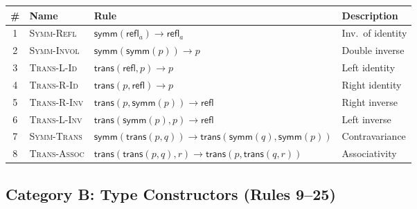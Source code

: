 \documentclass[manuscript]{BSLstyle}
\newcommand{\refl}{\mathsf{refl}}
\newcommand{\symm}{\mathsf{symm}}
\newcommand{\trans}{\mathsf{trans}}
\begin{document}
\begin{center}
\renewcommand{\arraystretch}{1.5}
\small
\begin{tabular}{clll}
\toprule
\# & \textbf{Name} & \textbf{Rule} & \textbf{Description} \\
\midrule
1 & \textsc{Symm-Refl} & $\symm(\refl_a) \to \refl_a$ & Inv.\ of identity \\
2 & \textsc{Symm-Invol} & $\symm(\symm(p)) \to p$ & Double inverse \\
3 & \textsc{Trans-L-Id} & $\trans(\refl, p) \to p$ & Left identity \\
4 & \textsc{Trans-R-Id} & $\trans(p, \refl) \to p$ & Right identity \\
5 & \textsc{Trans-R-Inv} & $\trans(p, \symm(p)) \to \refl$ & Right inverse \\
6 & \textsc{Trans-L-Inv} & $\trans(\symm(p), p) \to \refl$ & Left inverse \\
7 & \textsc{Symm-Trans} & $\symm(\trans(p,q)) \to \trans(\symm(q),\symm(p))$ & Contravariance \\
8 & \textsc{Trans-Assoc} & $\trans(\trans(p,q),r) \to \trans(p,\trans(q,r))$ & Associativity \\
\bottomrule
\end{tabular}
\end{center}

\subsection*{Category B: Type Constructors (Rules 9--25)}
\end{document}
